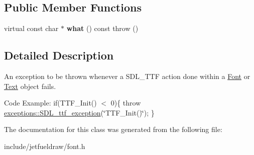 \subsection*{Public Member Functions}
\begin{DoxyCompactItemize}
\item 
\mbox{\label{classjetfuel_1_1draw_1_1exceptions_1_1SDL__ttf__exception_a55dd657b789c9df2b3373ce5d671e79a}} 
virtual const char $\ast$ {\bfseries what} () const  throw ()
\end{DoxyCompactItemize}


\subsection{Detailed Description}
An exception to be thrown whenever a S\+D\+L\+\_\+\+T\+TF action done within a \hyperlink{classjetfuel_1_1draw_1_1Font}{Font} or \hyperlink{classjetfuel_1_1draw_1_1Text}{Text} object fails.

Code Example\+: if(\+T\+T\+F\+\_\+\+Init() $<$ 0)\{ throw \hyperlink{classjetfuel_1_1draw_1_1exceptions_1_1SDL__ttf__exception}{exceptions\+::\+S\+D\+L\+\_\+ttf\+\_\+exception}(\char`\"{}\+T\+T\+F\+\_\+\+Init()\char`\"{}); \} 

The documentation for this class was generated from the following file\+:\begin{DoxyCompactItemize}
\item 
include/jetfueldraw/font.\+h\end{DoxyCompactItemize}
